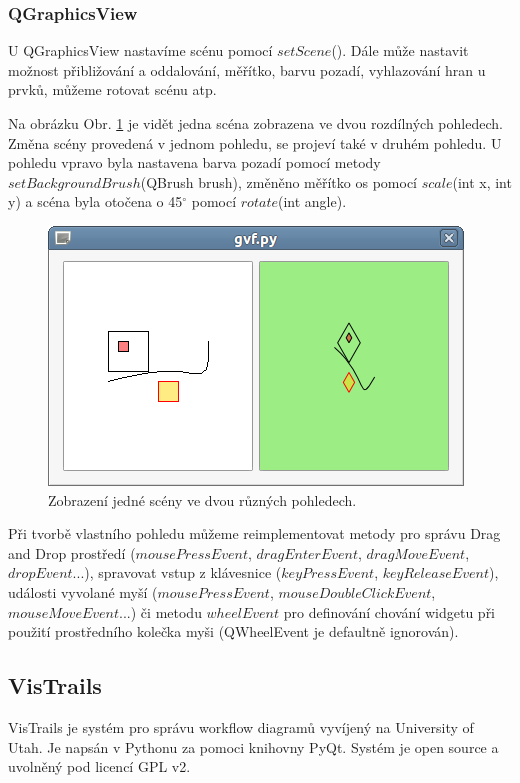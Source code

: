 \subsubsection*{QGraphicsView}
U QGraphicsView nastavíme scénu pomocí $setScene$(). Dále může nastavit možnost přibližování a oddalování, měřítko, barvu pozadí, vyhlazování hran u prvků, můžeme rotovat scénu atp.

Na obrázku Obr. \ref{gsf} je vidět jedna scéna zobrazena ve dvou rozdílných pohledech. Změna scény provedená v jednom pohledu, se projeví také v druhém pohledu. U pohledu vpravo byla nastavena barva pozadí pomocí metody $setBackgroundBrush$(QBrush brush), změněno měřítko os pomocí $scale$(int x, int y) a scéna byla otočena o 45$^\circ$ pomocí $rotate$(int angle). \\

\begin{figure}[h]
	\centering
	\includegraphics[scale=0.7]{pictures/qt/gsf}
	\caption{Zobrazení jedné scény ve dvou různých pohledech.}
	\label{gsf}
\end{figure}

Při tvorbě vlastního pohledu můžeme reimplementovat metody pro správu Drag and Drop prostředí ($mousePressEvent$, $dragEnterEvent$, $dragMoveEvent$, $dropEvent$...), spravovat vstup z klávesnice ($keyPressEvent$, $keyReleaseEvent$), události vyvolané myší ($mousePressEvent$, $mouseDoubleClickEvent$, $mouseMoveEvent$...) či metodu $wheelEvent$ pro definování chování widgetu při použití prostředního kolečka myši (QWheelEvent je defaultně ignorován).

\subsection{VisTrails}

VisTrails je systém pro správu workflow diagramů vyvíjený na University of Utah. Je napsán v Pythonu za pomoci knihovny PyQt. Systém je open source a uvolněný pod licencí GPL v2. 

